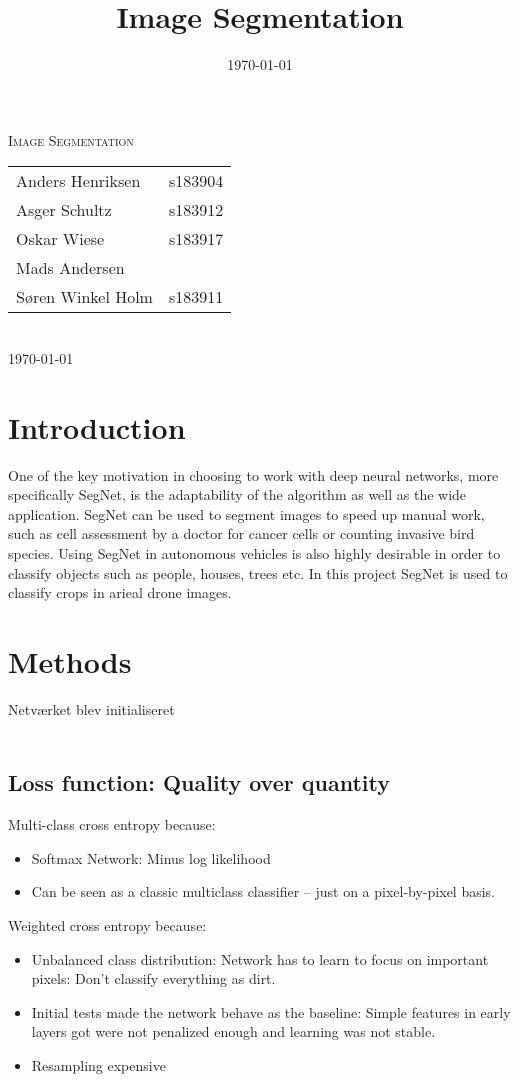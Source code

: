\documentclass[12pt,fleqn]{article}
\title{Image Segmentation}
\author{}
\date{\today}
\begin{document}

\begin{titlepage}
	\begin{center}
		\textsc{\LARGE Image Segmentation}\\
		[1.0cm]
		{
		\large
		\begin{tabular}{lr}
			Anders Henriksen&s183904\\
			Asger Schultz&s183912\\
			Oskar Wiese&s183917\\
			Mads Andersen&\\
			Søren Winkel Holm&s183911
		\end{tabular}
		}\\
		[0.5cm]
		\textsc{\large \today}
	\end{center}
\end{titlepage}
\tableofcontents \newpage


\section{Introduction}
One of the key motivation in choosing to work with deep neural networks, more specifically
SegNet, is the adaptability of the algorithm as well as the wide application. SegNet can be
used to segment images to speed up manual work, such as cell assessment by a doctor for
cancer cells or counting invasive bird species. Using SegNet in autonomous vehicles is also
highly desirable in order to classify objects such as people, houses, trees etc. In this project SegNet is used to classify crops in arieal drone images. 

\section{Methods}
Netværket blev initialiseret
\\
\\
\subsection{Loss function: Quality over quantity}
Multi-class cross entropy because:
\begin{itemize}
	\item Softmax Network: Minus log likelihood
	\item Can be seen as a classic multiclass classifier -- just on a pixel-by-pixel basis.
\end{itemize}
Weighted cross entropy because:
\begin{itemize}
	\item Unbalanced class distribution: Network has to learn to focus on important pixels: Don't classify everything as dirt.
	\item Initial tests made the network behave as the baseline: Simple features in early layers got were not penalized enough and learning was not stable.
	\item Resampling expensive
\end{itemize}
\end{document}
